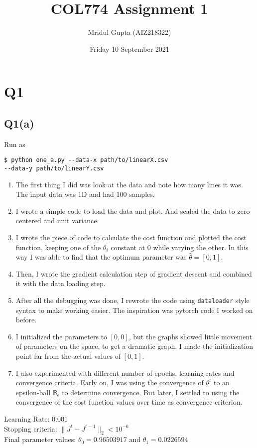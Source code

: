 \documentclass[11pt]{article}
\author{Mridul Gupta (AIZ218322)}
\date{Friday 10 September 2021}
\title{COL774 Assignment 1}
\begin{document}
\maketitle
\section{Q1}
\label{sec:orge4c8fb7}
\subsection{Q1(a)}
\label{sec:org99d1faf}
\begin{codebox}
Run as
\begin{verbatim}
$ python one_a.py --data-x path/to/linearX.csv
--data-y path/to/linearY.csv
\end{verbatim}
\end{codebox}
\begin{enumerate}
\item The first thing I did was look at the data and note how many
lines it was. The input data was 1D and had 100 samples.
\item I wrote a simple code to load the data and plot. And scaled
the data to zero centered and unit variance.
\item I wrote the piece of code to calculate the cost function
and plotted the cost function, keeping one of the \(\theta_i\)
constant at 0 while varying the other. In this way I was able to
find that the optimum parameter was \(\hat{\theta}=[0,1]\).
\item Then, I wrote the gradient calculation step of
gradient descent and combined it with the data loading step.
\item After all the debugging was done, I rewrote the code using
\texttt{dataloader} style syntax to make working easier. The
inspiration was pytorch code I worked on before.
\item I initialized the parameters to \([0,0]\), but the graphs showed
little movement of parameters on the space, to get a dramatic
graph, I made the initialization point far from the actual
values of \([0,1]\).
\item I also experimented with different number of epochs, learning
rates and convergence criteria. Early on, I was using the
convergence of \(\theta^t\) to an epsilon-ball \(\mathbb{B}_{\epsilon}\)
to determine convergence. But later, I settled to using the
convergence of the cost function values over time as convergence criterion.
\end{enumerate}
Learning Rate: 0.001\\
Stopping criteria: \(\lVert J^{t}-J^{t-1}\rVert_2 < 10^{-6}\)\\
Final parameter values: \(\theta_0=0.96503917\) and \(\theta_1=0.0226594\)
\end{document}
